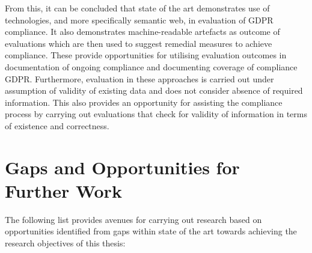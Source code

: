 From this, it can be concluded that state of the art demonstrates use of technologies, and more specifically semantic web, in evaluation of GDPR compliance. It also demonstrates machine-readable artefacts as outcome of evaluations which are then used to suggest remedial measures to achieve compliance. These provide opportunities for utilising evaluation outcomes in documentation of ongoing compliance and documenting coverage of compliance GDPR. Furthermore, evaluation in these approaches is carried out under assumption of validity of existing data and does not consider absence of required information. This also provides an opportunity for assisting the compliance process by carrying out evaluations that check for validity of information in terms of existence and correctness.

\section{Gaps and Opportunities for Further Work}\label{sec:sota:gaps}
The following list provides avenues for carrying out research based on opportunities identified from gaps within state of the art towards achieving the research objectives of this thesis:
